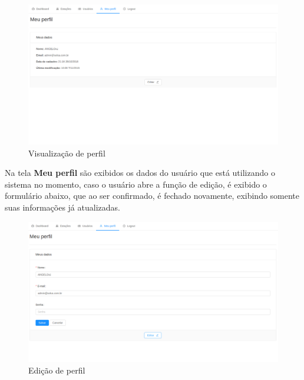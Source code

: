 \begin{figure}[H]
    \centering
    \caption{Visualização de perfil}
    \includegraphics[scale=0.3]{telas/perfil.png}
    \hfill
{}
\end{figure}

Na tela \textbf{Meu perfil} são exibidos os dados do usuário que está utilizando o sistema no momento, caso o usuário abre a função de edição, é exibido o formulário abaixo, que ao ser confirmado, é fechado novamente, exibindo somente suas informações já atualizadas.

\begin{figure}[H]
    \centering
    \caption{Edição de perfil}
    \includegraphics[scale=0.3]{telas/perfil_edit.png}
    \hfill
{}
\end{figure}


